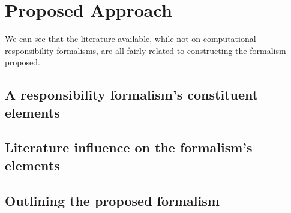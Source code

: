 \chapter{Proposed Approach}\label{sec:proposed_approach}

We can see that the literature available, while not on computational responsibility formalisms, are all fairly related to constructing the formalism proposed.\par

\section{A responsibility formalism's constituent elements}

\section{Literature influence on the formalism's elements}

\section{Outlining the proposed formalism}
